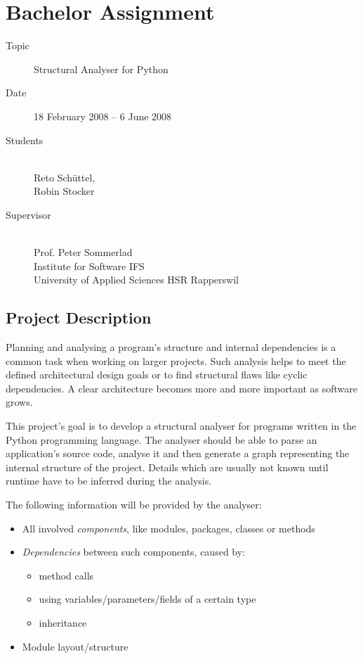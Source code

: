 \documentclass[10pt,halfparskip,DIV15]{scrartcl}
\begin{document}
\pagestyle{empty}

\section*{Bachelor Assignment}

\begin{description}
	\item[Topic] Structural Analyser for Python
	\item[Date] 18 February 2008 – 6 June 2008
	\item[Students] ~ \\
		Reto Schüttel, \\
		Robin Stocker
	\item[Supervisor] ~ \\ 
		Prof. Peter Sommerlad \\
		Institute for Software IFS \\
 		University of Applied Sciences HSR Rapperswil

\end{description}

\vspace{-0.5cm}

\subsection*{Project Description}

Planning and analysing a program's structure and internal dependencies is a common task when working on larger projects. Such analysis helps to meet the defined architectural design goals or to find structural flaws like cyclic dependencies. A clear architecture becomes more and more important as software grows.

This project's goal is to develop a structural analyser for programs written in the Python programming language. The analyser should be able to parse an application's source code, analyse it and then generate a graph representing the internal structure of the project. Details which are usually not known until runtime have to be inferred during the analysis.

The following information will be provided by the analyser: 
\begin{itemize}
	\item All involved \emph{components}, like modules, packages, classes or methods
	\item \emph{Dependencies} between such components, caused by:
	\begin{itemize}
		\item method calls
		\item using variables/parameters/fields of a certain type
		\item inheritance
	\end{itemize}
	\item Module layout/structure
\end{itemize}
\end{document}

